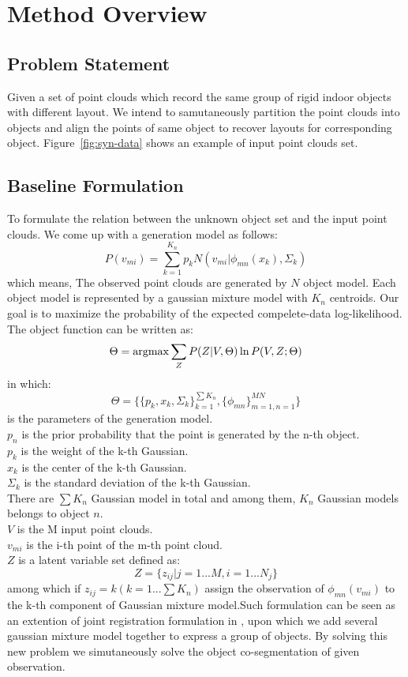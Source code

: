 \section{Method Overview}
\label{sec:method}
\subsection{Problem Statement}
Given a set of point clouds which record the same group of rigid indoor objects with different layout. We intend to samutaneously partition the point clouds into objects and align the points of same object to recover layouts for corresponding object. Figure~\ref{fig:syn-data} shows an example of input point clouds set.
\subsection{Baseline Formulation}
To formulate the relation between the unknown object set and the input point clouds. We come up with a generation model as follows:
\begin{equation}
\label{equ:model}
P(v_{mi})=\sum^{K_n}_{k=1}p_kN(v_{mi}|\phi_{mn}(x_k),\Sigma_k)
\end{equation}
which means,
The observed point clouds are generated by $N$ object model. 
Each object model is represented by a gaussian mixture model with $K_n$ centroids.
Our goal is to maximize the probability of the expected compelete-data log-likelihood. 
The object function can be written as:
\begin{equation}
\label{equ:obj0}
\Theta=\operatorname*{argmax}{\sum_ZP(Z|V,\Theta)\ln{P(V,Z;\Theta)}}
\end{equation}
in which:
$$\Theta=\{\{p_k,x_k,\Sigma_k\}_{k=1}^{\sum{K_n}},\{\phi_{mn}\}_{m=1,n=1}^{MN}\}$$
is the parameters of the generation model.\\
$p_n$ is the prior probability that the point is generated by the n-th object.\\
$p_k$ is the weight of the k-th Gaussian.\\
$x_k$ is the center of the k-th Gaussian.\\
$\Sigma_k$ is the standard deviation of the k-th Gaussian.\\
There are $\sum{K_n}$ Gaussian model in total and among them, $K_n$ Gaussian models belongs to object $n$.\\
$V$ is the M input point clouds.\\
$v_{mi}$ is the i-th point of the m-th point cloud.\\
$Z$ is a latent variable set defined as:\\
$$Z=\{z_{ij}|j=1...M,i=1...N_j\}$$
among which if $z_{ij}=k(k=1...\sum{K_n})$ assign the observation of $\phi_{mn}(v_{mi})$ to the k-th component of Gaussian mixture model.Such formulation can be seen as an extention of joint registration formulation in \cite{Evangelidis2014}, upon which we add several gaussian mixture model together to express a group of objects. By solving this new problem we simutaneously solve  the object co-segmentation of given observation.
